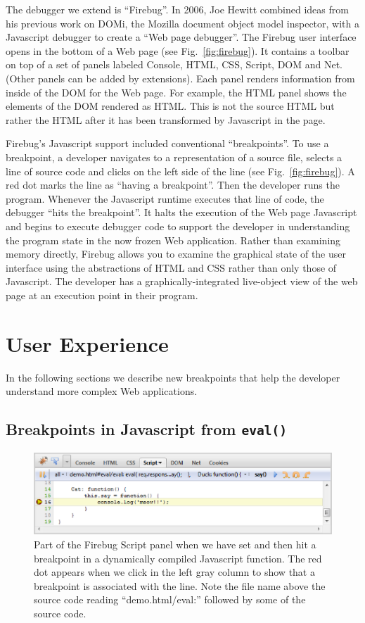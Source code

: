 \documentclass{www2010-accepted}
\begin{document}
The debugger we extend is ``Firebug''\cite{getfirebug}.  In 2006, Joe Hewitt
combined ideas from
his previous work on DOMi, the Mozilla document object model
inspector\cite{HewittDOMi}, with a Javascript debugger to create a ``Web page
debugger''.  The Firebug user interface opens in the bottom of a Web page (see
Fig.~\ref{fig:firebug}).  It contains a toolbar on top of a set of
panels labeled Console, HTML, CSS, Script, DOM and Net.  (Other panels
can be added by extensions). Each panel renders information from
inside of the DOM for the Web page.  For example, the HTML panel shows
the elements of the DOM rendered as HTML.  This is not the source HTML
but rather the HTML after it has been transformed by Javascript in the
page.

Firebug's Javascript support included conventional
``breakpoints''.
To use a breakpoint, a developer navigates to a
representation of a source file, selects a line of source code and
clicks on the left side of the line (see Fig.~\ref{fig:firebug}). A
red dot marks the line as ``having a breakpoint''.  Then the developer
runs the program.  Whenever the Javascript runtime executes that line
of code, the debugger ``hits the breakpoint''.  It halts the execution
of the Web page Javascript and begins to execute debugger code to
support the developer in understanding the program state in the now
frozen Web application. Rather than examining memory directly, Firebug
allows you to examine the graphical state of the user interface using
the abstractions of HTML and CSS rather than only those of Javascript.
The developer has a graphically-integrated live-object view of the web
page at an execution point in their program.


\section{User Experience}

 In the
following sections we describe new breakpoints that help the developer
understand more complex Web applications.

\subsection{Breakpoints in Javascript from \texttt{eval()}}

\begin{figure}[htp]
\center
\includegraphics[scale=0.7]{script_hit_eval_md5.eps}
\center\caption{Part of the Firebug Script panel when we have set and then
hit a breakpoint in a dynamically compiled Javascript function. The
red dot appears when we click in the left gray column to show that a
breakpoint is associated with the line. Note the file name above the
source code reading ``demo.html/eval:'' followed by some of the source
code.}
\label{fig:script_hit_eval_md5}
\end{figure}
\end{document}
